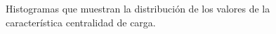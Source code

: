 \documentclass{article}
\begin{document}
\begin{figure}[htbp]

\caption{Histogramas que muestran la distribución de los valores de la característica centralidad de carga. }
\label{fig10} 
\end{figure}
\end{document}
